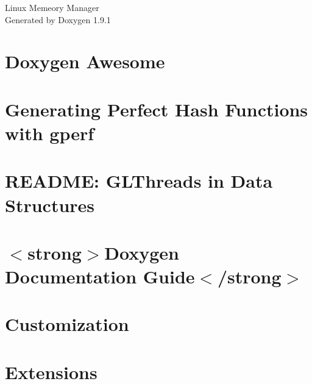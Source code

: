 \let\mypdfximage\pdfximage\def\pdfximage{\immediate\mypdfximage}\documentclass[twoside]{book}
\newcommand{\+}{\discretionary{\mbox{\scriptsize$\hookleftarrow$}}{}{}}
\newcommand{\clearemptydoublepage}{%
  \newpage{\pagestyle{empty}\cleardoublepage}%
}
\begin{document}
\raggedbottom

\hypersetup{pageanchor=false,
             bookmarksnumbered=true,
             pdfencoding=unicode
            }
\begin{titlepage}
\vspace*{7cm}
\begin{center}%
{\Large Linux Memeory Manager }\\
\vspace*{1cm}
{\large Generated by Doxygen 1.9.1}\\
\end{center}
\end{titlepage}
\clearemptydoublepage
{}
\tableofcontents
\clearemptydoublepage
{}
\hypersetup{pageanchor=true}

\chapter{Doxygen Awesome}
\label{index}\hypertarget{index}{}
\chapter{Generating Perfect Hash Functions with gperf}
\label{md_docs_pages_gperf}

\chapter{README\+: GLThreads in Data Structures}
\label{md_docs_pages_README_GLThreads_in_Data_Structures}

\chapter{$<$strong$>$Doxygen Documentation Guide$<$/strong$>$}
\label{md_docs_pages_README_doxygen}

\chapter{Customization}
\label{md_docs_theme_doxygen_awesome_docs_customization}

\chapter{Extensions}
\label{md_docs_theme_doxygen_awesome_docs_extensions}

\end{document}
